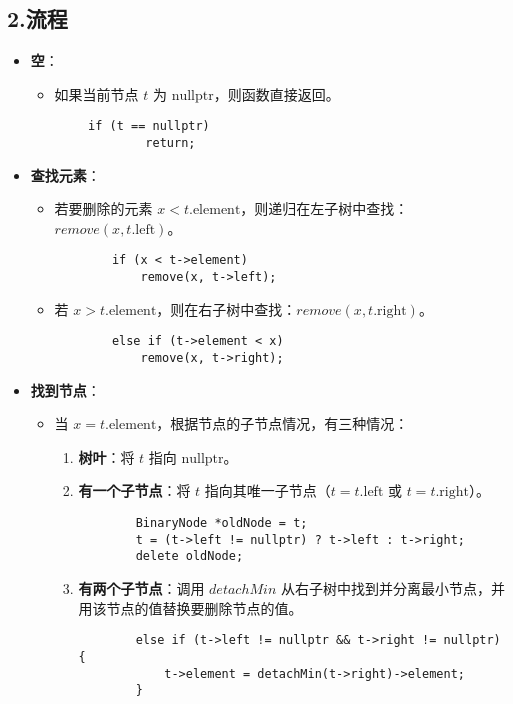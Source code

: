 \documentclass[a4paper]{article}
\begin{document}
\subsection*{2.流程}
\begin{itemize}
    \item \textbf{空}：
    \begin{itemize}
        \item 如果当前节点 $t$ 为 $\text{nullptr}$，则函数直接返回。
    \end{itemize}
    \begin{lstlisting}
        if (t == nullptr)
                return;
    \end{lstlisting}
    \item \textbf{查找元素}：
    \begin{itemize}
        \item 若要删除的元素 $x < t.\text{element}$，则递归在左子树中查找：$remove(x, t.\text{left})$。
        \begin{lstlisting}
        if (x < t->element)
            remove(x, t->left);
        \end{lstlisting}
        \item 若 $x > t.\text{element}$，则在右子树中查找：$remove(x, t.\text{right})$。
        \begin{lstlisting}
        else if (t->element < x)
            remove(x, t->right);
        \end{lstlisting}
    \end{itemize}
    
    \item \textbf{找到节点}：
    \begin{itemize}
        \item 当 $x = t.\text{element}$，根据节点的子节点情况，有三种情况：
        \begin{enumerate}
            \item \textbf{树叶}：将 $t$ 指向 $\text{nullptr}$。
            \item \textbf{有一个子节点}：将 $t$ 指向其唯一子节点（$t = t.\text{left}$ 或 $t = t.\text{right}$）。
            \begin{lstlisting}
        BinaryNode *oldNode = t;
        t = (t->left != nullptr) ? t->left : t->right;
        delete oldNode;
            \end{lstlisting}
            \item \textbf{有两个子节点}：调用 $detachMin$ 从右子树中找到并分离最小节点，并用该节点的值替换要删除节点的值。
            \begin{lstlisting}
        else if (t->left != nullptr && t->right != nullptr) {
            t->element = detachMin(t->right)->element;
        }
            \end{lstlisting}
        \end{enumerate}
    \end{itemize}
\end{itemize}
\end{document}
